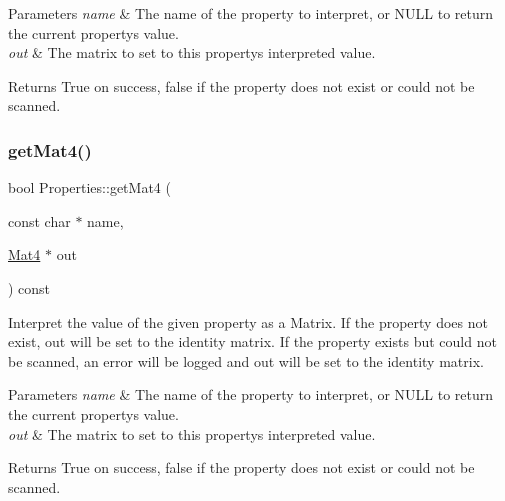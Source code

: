 \begin{DoxyParams}{Parameters}
{\em name} & The name of the property to interpret, or N\+U\+LL to return the current property\textquotesingle{}s value. \\
\hline
{\em out} & The matrix to set to this property\textquotesingle{}s interpreted value.\\
\hline
\end{DoxyParams}
\begin{DoxyReturn}{Returns}
True on success, false if the property does not exist or could not be scanned. 
\end{DoxyReturn}
\mbox{\label{classProperties_adf89d5ec337d5cd247b79b6083c820d8}} 
\subsubsection{\texorpdfstring{get\+Mat4()}{getMat4()}\hspace{0.1cm}{\footnotesize\ttfamily [2/2]}}
{\footnotesize\ttfamily bool Properties\+::get\+Mat4 (\begin{DoxyParamCaption}\item[{const char $\ast$}]{name,  }\item[{\hyperlink{classMat4}{Mat4} $\ast$}]{out }\end{DoxyParamCaption}) const}

Interpret the value of the given property as a Matrix. If the property does not exist, out will be set to the identity matrix. If the property exists but could not be scanned, an error will be logged and out will be set to the identity matrix.


\begin{DoxyParams}{Parameters}
{\em name} & The name of the property to interpret, or N\+U\+LL to return the current property\textquotesingle{}s value. \\
\hline
{\em out} & The matrix to set to this property\textquotesingle{}s interpreted value.\\
\hline
\end{DoxyParams}
\begin{DoxyReturn}{Returns}
True on success, false if the property does not exist or could not be scanned. 
\end{DoxyReturn}
\mbox{\label{classProperties_a477722d07bc4b16275f05f82e443b67e}} 
